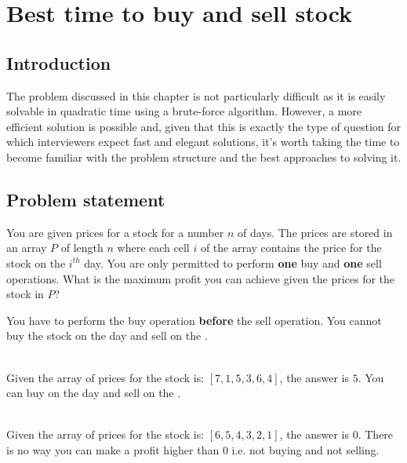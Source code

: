 %

\chapter{Best time to buy and sell stock}
\label{ch:buy_sell_stocks}
\section*{Introduction}
The problem discussed in this chapter is not particularly difficult as it is easily solvable in quadratic time using a brute-force algorithm. 
However, a more efficient solution is possible and, given that this is exactly the type of question for which interviewers expect fast and elegant solutions, it's worth taking the time to become familiar with the problem structure and the best approaches to solving it.  

\section{Problem statement}
\label{sec:buy_sell_stocks:statement1}
\begin{exercise}
You are given prices for a stock for a number $n$ of days. The prices are stored in an array $P$ of length $n$ where each cell $i$ of the array contains the price for the stock on the $i^{th}$ day. You are only permitted to perform \textbf{one} buy and \textbf{one} sell operations. What is the maximum profit you can achieve given the prices for the stock in $P$?

You have to perform the buy operation \textbf{before} the sell operation. You cannot buy the stock on the  day and sell on the .

\begin{example}
	\hfill \\
	Given the array of prices for the stock is: $[7,1,5,3,6,4]$, the answer is $5$. You can buy on the  day and sell on the .
\end{example}

\begin{example}
	\hfill \\
	Given the array of prices for the stock is: $[6,5,4,3,2,1]$, the answer is $0$. There is no way you can make a profit higher than $0$ i.e. not buying and not selling. 
\end{example}

\end{exercise}

